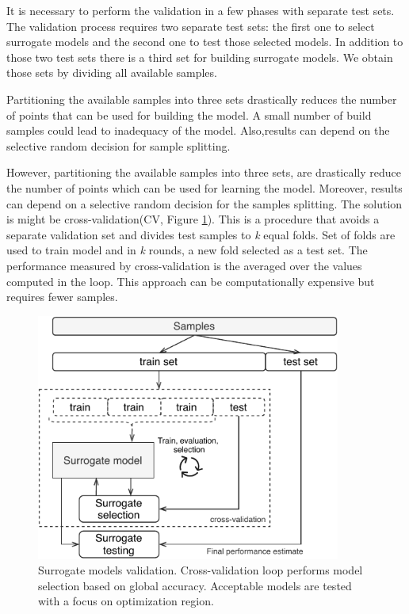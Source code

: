         
        It is necessary to perform the validation in a few phases with separate test sets. The validation process requires two separate test sets: the first one to select surrogate models and the second one to test those selected models. In addition to those two test sets there is a third set for building surrogate models. We obtain those sets by dividing all available samples.
        
        
        Partitioning the available samples into three sets drastically reduces the number of points that can be used for building the model. A small number of build samples could lead to inadequacy of the model. Also,results can depend on the selective random decision for sample splitting. 
        
        However, partitioning the available samples into three sets, are drastically reduce the number of points which can be used for learning the model. Moreover, results can depend on a selective random decision for the samples splitting. The solution is might be cross-validation(CV, Figure \ref{fig:cv}). This is a procedure that avoids a separate validation set and divides test samples to \textit{k} equal folds. Set of folds are used to train model and in \textit{k} rounds, a new fold selected as a test set. The performance measured by cross-validation is the averaged over the values computed in the loop. This approach can be computationally expensive but requires fewer samples. 

        \begin{figure}[h]
            \centering
            \includegraphics[width=10cm]{content/images/cv}
            \caption[Cross-validation: exploration vs exploitation]{Surrogate models validation. Cross-validation loop performs model selection based on global accuracy. Acceptable models are tested with a focus on optimization region. } 
            \label{fig:cv}   
        \end{figure}
    

